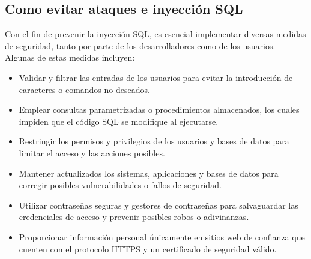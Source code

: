 \documentclass[11pt]{report}
\begin{document}
\subsection{Como evitar ataques e inyección SQL}
Con el fin de prevenir la inyección SQL, es esencial implementar diversas medidas de
seguridad, tanto por parte de los desarrolladores como de los usuarios. Algunas de estas
medidas incluyen:
\begin{itemize}
\item Validar y filtrar las entradas de los usuarios para evitar la introducción de caracteres
o comandos no deseados.
\item Emplear consultas parametrizadas o procedimientos almacenados, los cuales
impiden que el código SQL se modifique al ejecutarse.
\item Restringir los permisos y privilegios de los usuarios y bases de datos para limitar el
acceso y las acciones posibles.
\item Mantener actualizados los sistemas, aplicaciones y bases de datos para corregir
posibles vulnerabilidades o fallos de seguridad.
\item Utilizar contraseñas seguras y gestores de contraseñas para salvaguardar las
credenciales de acceso y prevenir posibles robos o adivinanzas.
\item Proporcionar información personal únicamente en sitios web de confianza que
cuenten con el protocolo HTTPS y un certificado de seguridad válido.
\end{itemize}

\cleardoublepage

\end{document}
